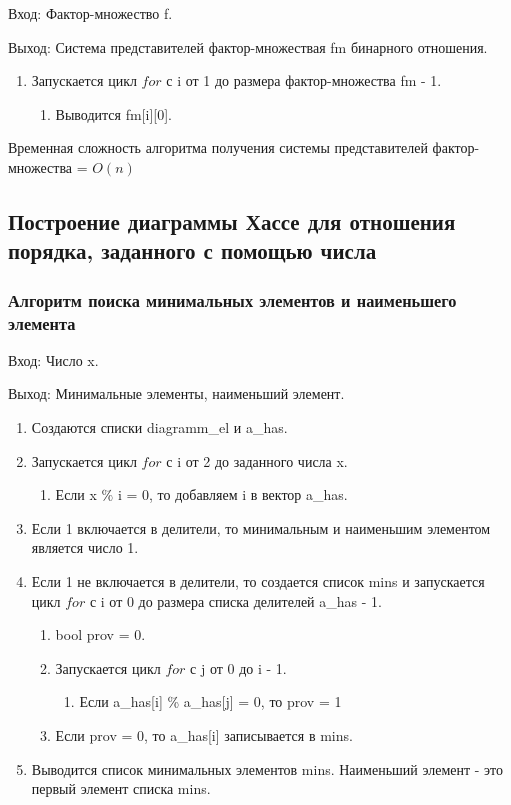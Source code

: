 \documentclass[bachelor, och, labwork]{shiza}
\begin{document}
	$\textit{Вход:}$ Фактор-множество f.
	
	$\textit{Выход:}$  Система представителей фактор-множествая fm бинарного отношения.
	
	\begin{enumerate} 
		\item Запускается цикл $for$ с i от 1 до размера фактор-множества fm - 1. 
		\begin{enumerate} 
			\item Выводится fm[i][0].
		\end{enumerate} 
	\end{enumerate} 

	Временная сложность алгоритма получения системы представителей фактор-множества = $O(n)$	
	
	\subsection{Построение диаграммы Хассе для отношения порядка, заданного с помощью числа}	

	
		\subsubsection{Алгоритм поиска минимальных элементов и наименьшего элемента}	
		
		$\textit{Вход:}$ Число x.
		
		$\textit{Выход:}$  Минимальные элементы, наименьший элемент.
		
		\begin{enumerate} 
		\item Создаются списки diagramm\_el и a\_has. 
		\item Запускается цикл $for$ с i от 2 до заданного числа x. 
			\begin{enumerate} 
				\item Если x $\%$ i = 0, то добавляем i в вектор a\_has.
			\end{enumerate} 
		\item Если 1 включается в делители, то минимальным и наименьшим элементом является число 1.
		\item Если 1 не включается в делители, то создается список mins  и запускается цикл $for$ с i от 0 до размера списка делителей a\_has - 1. 
			\begin{enumerate} 
				\item bool prov = 0.
				\item Запускается цикл $for$ с j от 0 до i - 1. 
				\begin{enumerate} 
					\item Если a\_has[i] \% a\_has[j] = 0, то prov = 1
				\end{enumerate}
				\item Если prov = 0, то a\_has[i] записывается в mins.
			\end{enumerate}
		\item Выводится список минимальных элементов mins. Наименьший элемент - это первый элемент списка mins.
		\end{enumerate} 
\end{document}
